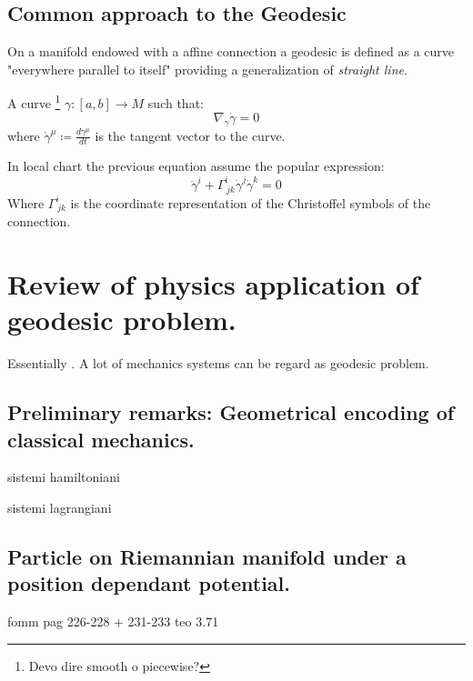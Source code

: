 \documentclass[a4paper,12pt]{scrartcl}    %
\begin{document}
\subsection{Common approach to the Geodesic}
	On a manifold endowed with a affine connection a geodesic is defined as a curve "everywhere parallel to itself" providing a generalization of \emph{straight line}.
	\begin{definition}[Geodesic]
		A curve \danger\footnote{Devo dire smooth o piecewise? }
		$\gamma:[a,b]\rightarrow M$ such that:
		\begin{equation}
			\nabla_{\dot{\gamma}}\dot{\gamma} =0
		\end{equation}
		where $\dot{\gamma}^\mu \coloneqq \frac{d \gamma^\mu}{d t}$ is the tangent vector to the curve.
	\end{definition}
	\begin{notationfix}
		In local chart the previous equation assume the popular expression:
		\begin{equation}\label{GeodesicEquation}
			\ddot{\gamma}^i + \Gamma^i_{\, j k} \dot{\gamma}^j \dot{\gamma}^k = 0
		\end{equation}
		Where $ \Gamma^i_{\, j k}$ is the coordinate representation of the Christoffel symbols of the connection.
	\end{notationfix}
	\hspace{5mm}


\newpage
\section{Review of physics application of geodesic problem.}
Essentially \cite{Abraham1978}.
\vspace{6mm}
A lot of mechanics systems can be regard as geodesic problem.

\subsection{Preliminary remarks: Geometrical encoding of classical mechanics.}
    sistemi hamiltoniani

    sistemi lagrangiani
    
\subsection{Particle on Riemannian manifold under a position dependant potential.}	
	fomm pag 226-228 + 231-233       teo 3.71
 
\end{document}
